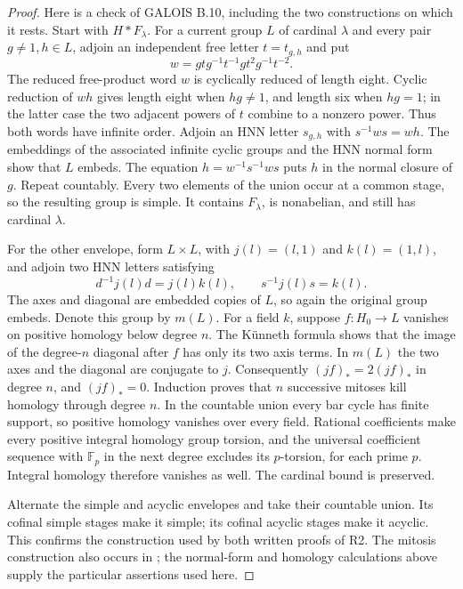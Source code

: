 \begin{proof}
Here is a check of GALOIS B.10, including the two constructions on which
it rests. Start with $H*F_\lambda$. For a current group $L$ of cardinal
$\lambda$ and every pair $g\ne1,h\in L$, adjoin an independent free letter
$t=t_{g,h}$ and put
\[
 w=g t g^{-1}t^{-1}g t^2g^{-1}t^{-2}.
\]
The reduced free-product word $w$ is cyclically reduced of length eight.
Cyclic reduction of $wh$ gives length eight when $hg\ne1$, and length
six when $hg=1$; in the latter case the two adjacent powers of $t$
combine to a nonzero power. Thus both words have infinite order. Adjoin
an HNN letter $s_{g,h}$ with $s^{-1}ws=wh$. The embeddings of the
associated infinite cyclic groups and the HNN normal form show that
$L$ embeds. The equation $h=w^{-1}s^{-1}ws$ puts $h$ in the normal
closure of $g$. Repeat countably. Every two elements of the union occur
at a common stage, so the resulting group is simple. It contains
$F_\lambda$, is nonabelian, and still has cardinal $\lambda$.

For the other envelope, form $L\times L$, with $j(l)=(l,1)$ and
$k(l)=(1,l)$, and adjoin two HNN letters satisfying
\[
 d^{-1}j(l)d=j(l)k(l),\qquad s^{-1}j(l)s=k(l).
\]
The axes and diagonal are embedded copies of $L$, so again the original
group embeds. Denote this group by $m(L)$. For a field $k$, suppose
$f:H_0\to L$ vanishes on positive homology below degree $n$. The
K\"unneth formula shows that the image of the degree-$n$ diagonal after
$f$ has only its two axis terms. In $m(L)$ the two axes and the diagonal
are conjugate to $j$. Consequently $(jf)_*=2(jf)_*$ in degree $n$,
and $(jf)_*=0$. Induction proves that $n$ successive mitoses kill
homology through degree $n$. In the countable union every bar cycle
has finite support, so positive homology vanishes over every field.
Rational coefficients make every positive integral homology group
torsion, and the universal coefficient sequence with $\mathbb F_p$ in
the next degree excludes its $p$-torsion, for each prime $p$. Integral
homology therefore vanishes as well. The cardinal bound is preserved.

Alternate the simple and acyclic envelopes and take their countable
union. Its cofinal simple stages make it simple; its cofinal acyclic
stages make it acyclic. This confirms the construction used by both
written proofs of R2. The mitosis construction also occurs in
\cite[Sections 4--5]{A_BDH1980}; the normal-form and homology calculations
above supply the particular assertions used here.
\end{proof}

